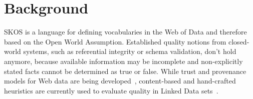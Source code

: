 
\section{Background}\label{sec:background}


SKOS is a language for defining vocabularies in the Web of Data and therefore based on the Open World Assumption. Established quality notions from closed-world systems, such as referential integrity or schema validation, don't hold anymore, because available information may be incomplete and non-explicitly stated facts cannot be determined as true or false. While trust and provenance models for Web data are being developed~\cite{Omitola2011,Hartig2009}, content-based and hand-crafted heuristics are currently used to evaluate quality in Linked Data sets~\cite{Heath2011}.






